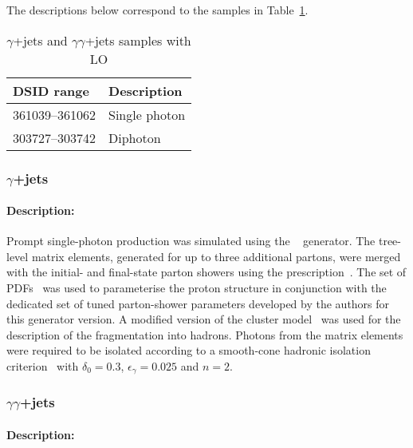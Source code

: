 The descriptions below correspond to the samples in Table~\ref{tab:gammajets-sherpa-lo}.
\begin{table}[!htbp]
\begin{center}
\caption{$\gamma$+jets and  $\gamma\gamma$+jets samples with \SHERPA LO} \label{tab:gammajets-sherpa-lo}
\begin{tabular}{ l | l }
\hline
DSID range & Description \\
\hline
361039--361062 &  Single photon \\
303727--303742 &  Diphoton \\
\hline
\end{tabular}
\end{center}
\end{table}

\subsubsection[y+jets]{$\gamma$+jets}


\paragraph{Description:}

Prompt single-photon production was simulated using the \SHERPA[2.1]~\cite{Bothmann:2019yzt}
generator. The tree-level matrix elements, generated for up to three
additional partons, were merged with the initial- and final-state parton showers using the
\MEPSatLO prescription~\cite{Hoeche:2009rj}. The \CT[10nlo] set of PDFs~\cite{Lai:2010vv} was
used to parameterise the proton structure in conjunction with the dedicated set of tuned
parton-shower parameters developed by the \SHERPA authors for this generator version. A
modified version of the cluster model~\cite{Winter:2003tt} was used
for the description of the fragmentation into hadrons. Photons from the matrix elements were
required to be isolated according to a smooth-cone hadronic isolation criterion~\cite{Frixione:1998jh}
with $\delta_0=0.3$, $\epsilon_{\gamma}=0.025$ and $n=2$.




\subsubsection[yy+jets]{ $\gamma\gamma$+jets}


\paragraph{Description:}

